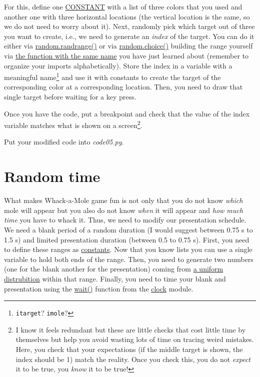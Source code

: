 \documentclass[
]{book}
\begin{document}
For this, define one \protect\hyperlink{constants}{CONSTANT} with a list of three colors that you used and another one with three horizontal locations (the vertical location is the same, so we do not need to worry about it). Next, randomly pick which target out of three you want to create, i.e., we need to generate an \emph{index} of the target. You can do it either via \href{https://docs.python.org/3/library/random.html\#random.randrange}{random.randrange()} or via \href{https://docs.python.org/3/library/random.html\#random.choice}{random.choice()} building the range yourself via \href{}{the function with the same name} you have just learned about (remember to organize your imports alphabetically). Store the index in a variable with a meaningful name\footnote{\texttt{itarget}? \texttt{imole}?} and use it with constants to create the target of the corresponding color at a corresponding location. Then, you need to draw that single target before waiting for a key press.

Once you have the code, put a breakpoint and check that the value of the index variable matches what is shown on a screen\footnote{I know it feels redundant but these are little checks that cost little time by themselves but help you avoid wasting lots of time on tracing weird mistakes. Here, you check that your expectations (if the middle target is shown, the index should be 1) match the reality. Once you check this, you do not \emph{expect} it to be true, you \emph{know} it to be true!}.

Put your modified code into \emph{code05.py}.

\hypertarget{clock-wait}{%
\section{Random time}\label{clock-wait}}

What makes Whack-a-Mole game fun is not only that you do not know \emph{which} mole will appear but you also do not know \emph{when} it will appear and \emph{how much time} you have to whack it. Thus, we need to modify our presentation schedule. We need a blank period of a random duration (I would suggest between 0.75 s to 1.5 s) and limited presentation duration (between 0.5 to 0.75 s). First, you need to define these ranges as \protect\hyperlink{constants}{constants}. Now that you know lists you can use a single variable to hold both ends of the range. Then, you need to generate two numbers (one for the blank another for the presentation) coming from \href{https://docs.python.org/3/library/random.html\#random.uniform}{a uniform distrubition} within that range. Finally, you need to time your blank and presentation using the \href{https://psychopy.org/api/clock.html\#psychopy.clock.wait}{wait()} function from the \href{https://psychopy.org/api/clock.html}{clock} module.
\end{document}
